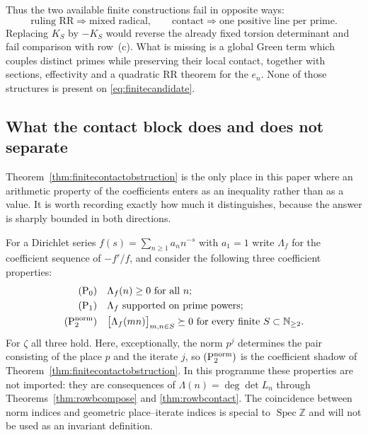 \documentclass[11pt]{amsart}
\theoremstyle{definition}
\theoremstyle{remark}
\newcommand{\N}{\mathbb N}
\newcommand{\Z}{\mathbb Z}
\newcommand{\Spec}{\operatorname{Spec}}
\begin{document}
Thus the two available finite constructions fail in opposite ways:
\begin{equation}\label{eq:finitealternative}
 \text{ruling RR}\Longrightarrow\text{mixed radical},
 \qquad
 \text{contact}\Longrightarrow\text{one positive line per prime}.
\end{equation}
Replacing $K_S$ by $-K_S$ would reverse the already fixed torsion determinant
and fail comparison with row~(c).  What is missing is a global Green term
which couples distinct primes while preserving their local contact, together
with sections, effectivity and a quadratic RR theorem for the $e_n$.  None of
those structures is present on \eqref{eq:finitecandidate}.

\subsection{What the contact block does and does not separate}
\label{ss:contactseparation}

Theorem~\ref{thm:finitecontactobstruction} is the only place in this paper
where an arithmetic property of the coefficients enters as an inequality
rather than as a value.  It is worth recording exactly how much it
distinguishes, because the answer is sharply bounded in both directions.

For a Dirichlet series $f(s)=\sum_{n\ge1}a_nn^{-s}$ with $a_1=1$ write
$\Lambda_f$ for the coefficient sequence of $-f'/f$, and consider the
following three coefficient properties:
\begin{align}
 \mathrm{(P_0)}&\quad \Lambda_f(n)\ge0\ \hbox{for all }n;\notag\\
 \mathrm{(P_1)}&\quad \Lambda_f\ \hbox{supported on prime powers};
   \label{eq:coefficienthierarchy}\\
 \mathrm{(P_2^{\rm norm})}&\quad
   \bigl[\Lambda_f(mn)\bigr]_{m,n\in S}\succeq0\ \hbox{for every finite }S
   \subset\N_{\ge2}.\notag
\end{align}
For $\zeta$ all three hold.  Here, exceptionally, the norm $p^j$ determines
the pair consisting of the place $p$ and the iterate $j$, so
$\mathrm{(P_2^{\rm norm})}$ is the coefficient shadow of
Theorem~\ref{thm:finitecontactobstruction}.  In this programme these
properties are not imported: they are consequences of
$\Lambda(n)=\deg\det L_n$ through Theorems~\ref{thm:rowbcompose} and
\ref{thm:rowbcontact}.  The coincidence between norm indices and geometric
place--iterate indices is special to $\Spec\Z$ and will not be used as an
invariant definition.
\end{document}
